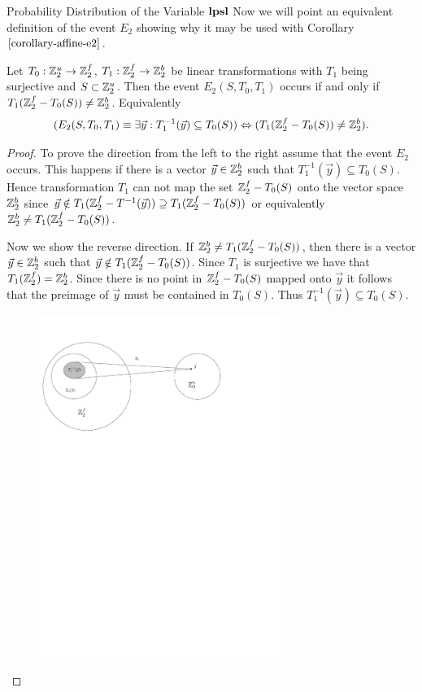 \begin{section}{Probability Distribution of the Variable \texorpdfstring{$\mathbf{lpsl}$}{lpsl}}
Now we will point an equivalent definition of the event $E_2$ showing why it may be used with Corollary $\ref{corollary-affine-e2}$.
\begin{remark}
\label{remark-e2-equivalency}
Let $T_0: \mathbb{Z}_{2}^{u} \rightarrow \mathbb{Z}_{2}^{f}$, $T_1: \mathbb{Z}_{2}^{f} \rightarrow \mathbb{Z}_{2}^{b}$ be linear transformations with $T_1$ being surjective and $S \subset \mathbb{Z}_{2}^{u}$. Then the event $E_2(S, T_0, T_1)$ occurs if and only if $T_1(\mathbb{Z}_{2}^{f} - T_0(S)) \neq \mathbb{Z}_{2}^{b}$. Equivalently
\[
	(E_2(S, T_0, T_1) \equiv \exists \vec{y}: T_1^{-1}(\vec{y}) \subseteq T_0(S)) \Leftrightarrow (T_1(\mathbb{Z}_{2}^{f} - T_0(S)) \neq \mathbb{Z}_{2}^{b}) \text{.}
\]
\end{remark}
\begin{proof}
To prove the direction from the left to the right assume that the event $E_2$ occurs. This happens if there is a vector $\vec{y} \in \mathbb{Z}_{2}^{b}$ such that $T_1^{-1}(\vec{y}) \subseteq T_0(S)$. Hence transformation $T_1$ can not map the set $\mathbb{Z}_{2}^{f} - T_0(S)$ onto the vector space $\mathbb{Z}_{2}^{b}$ since $\vec{y} \notin T_1(\mathbb{Z}_{2}^{f} - T^{-1}(\vec{y})) \supseteq T_1(\mathbb{Z}_{2}^{f} - T_0(S))$ or equivalently $\mathbb{Z}_{2}^{b} \neq T_1(\mathbb{Z}_{2}^{f} - T_0(S))$.

Now we show the reverse direction. If $\mathbb{Z}_{2}^{b} \neq T_1(\mathbb{Z}_{2}^{f} - T_0(S))$, then there is a vector $\vec{y} \in \mathbb{Z}_{2}^{b}$ such that $\vec{y} \notin T_1(\mathbb{Z}_{2}^{f} - T_0(S))$. Since $T_1$ is surjective we have that $T_1(\mathbb{Z}_{2}^{f}) = \mathbb{Z}_{2}^{b}$. Since there is no point in $\mathbb{Z}_{2}^{f} - T_0(S)$ mapped onto $\vec{y}$ it follows that the preimage of $\vec{y}$ must be contained in $T_0(S)$. Thus $T_1^{-1}(\vec{y}) \subseteq T_0(S)$.

\begin{figure}
  \centering
    \includegraphics[width=0.7\textwidth]{images/e2}


\end{figure}
\end{proof}
\end{section}
